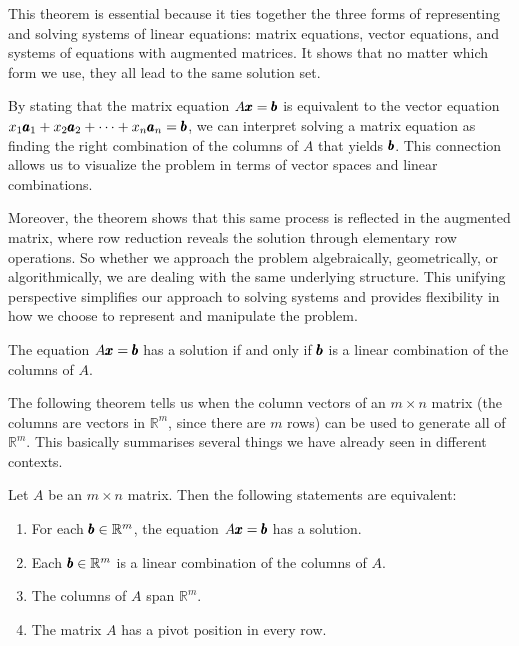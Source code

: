 This theorem is essential because it ties together the three forms of representing and solving systems of linear equations: matrix equations, vector equations, and systems of equations with augmented matrices. It shows that no matter which form we use, they all lead to the same solution set.

By stating that the matrix equation \( A \pmb{x} = \pmb{b} \) is equivalent to the vector equation \( x_1 \pmb{a}_1 + x_2 \pmb{a}_2 + \cdots + x_n \pmb{a}_n = \pmb{b} \), we can interpret solving a matrix equation as finding the right combination of the columns of \( A \) that yields \( \pmb{b} \). This connection allows us to visualize the problem in terms of vector spaces and linear combinations.

Moreover, the theorem shows that this same process is reflected in the augmented matrix, where row reduction reveals the solution through elementary row operations. So whether we approach the problem algebraically, geometrically, or algorithmically, we are dealing with the same underlying structure. This unifying perspective simplifies our approach to solving systems and provides flexibility in how we choose to represent and manipulate the problem.

\begin{remark}
    The equation $A \pmb{x} = \pmb{b}$ has a solution if and only if $\pmb{b}$ is a linear combination of the columns of $A$.
\end{remark}

The following theorem tells us when the column vectors of an $m \times n$ matrix (the columns are vectors in $\mathbb{R}^m$, since there are $m$ rows) can be used to generate all of $\mathbb{R}^m$. This basically summarises several things we have already seen in different contexts.

\begin{theorem}
Let \( A \) be an \( m \times n \) matrix. Then the following statements are equivalent:
\begin{enumerate}[label=(\alph*)]
    \item For each \( \pmb{b} \in \mathbb{R}^m \), the equation \( A \pmb{x} = \pmb{b} \) has a solution.
    \item Each \( \pmb{b} \in \mathbb{R}^m \) is a linear combination of the columns of \( A \).
    \item The columns of \( A \) span \( \mathbb{R}^m \).
    \item The matrix \( A \) has a pivot position in every row.
\end{enumerate}
\end{theorem}

